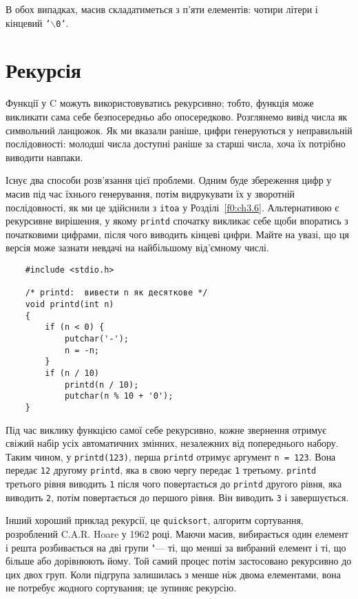 \documentclass[a4paper,12pt]{book}
\begin{document}
  В обох випадках, масив складатиметься з п'яти елементів: чотири літери і кінцевий
  \texttt{'\mbox{$\backslash$}0'}.

\section{Рекурсія}


  Функції у C можуть використовуватись рекурсивно; тобто, функція може викликати сама
  себе безпосередньо або опосередково. Розглянемо вивід числа як символьний ланцюжок. Як
  ми вказали раніше, цифри генеруються у неправильній послідовності: молодші числа
  доступні раніше за старші числа, хоча їх потрібно виводити навпаки.

  Існує два способи розв'язання цієї проблеми. Одним буде збереження цифр у масив під час
  їхнього генерування, потім видрукувати їх у зворотній послідовності, як ми це здійснили
  з \texttt{itoa} у Розділі~\ref{f0:ch3.6}. Альтернативою є рекурсивне
  вирішення, у якому \texttt{printd} спочатку викликає себе щоби впоратись з початковими
  цифрами, після чого виводить кінцеві цифри. Майте на увазі, що ця версія може зазнати
  невдачі на найбільшому від'ємному числі.
  \begin{verbatim}
    #include <stdio.h>

    /* printd:  вивести n як десяткове */
    void printd(int n)
    {
        if (n < 0) {
            putchar('-');
            n = -n;
        }
        if (n / 10)
            printd(n / 10);
            putchar(n % 10 + '0');
    }
  \end{verbatim}

  Під час виклику функцією самої себе рекурсивно, кожне звернення отримує свіжий набір
  усіх автоматичних змінних, незалежних від попереднього набору. Таким чином, у
  \texttt{printd(123)}, перша \texttt{printd} отримує аргумент \texttt{n = 123}. Вона
  передає \texttt{12} другому \texttt{printd}, яка в свою чергу передає \texttt{1}
  третьому. \texttt{printd} третього рівня виводить \texttt{1} після чого повертається до
  \texttt{printd} другого рівня, яка виводить \texttt{2}, потім повертається до першого
  рівня. Він виводить \texttt{3} і завершується.

  Інший хороший приклад рекурсії, це \texttt{quicksort}, алгоритм сортування, розроблений
  C.A.R. Hoare у 1962 році. Маючи масив, вибирається один елемент і решта розбивається на
  дві групи "--- ті, що менші за вибраний елемент і ті, що більше або дорівнюють йому.
  Той самий процес потім застосовано рекурсивно до цих двох груп. Коли підгрупа залишилась
  з менше ніж двома елементами, вона не потребує жодного сортування; це зупиняє рекурсію.
\end{document}
